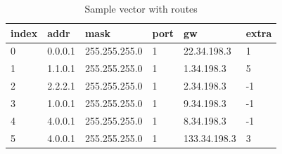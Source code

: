 \documentclass[a4paper,marginparwidth=50pt,marginparsep=10pt]{article}
\begin{document}
\begin{table}[float=tph]
\begin{center}
\begin{tabular}{|l|l|l|l|l|l|}
\hline index & addr & mask & port & gw & extra\\ 
\hline 0 & 0.0.0.1 & 255.255.255.0 & 1& 22.34.198.3 & 1\\ 
\hline 1 & 1.1.0.1 & 255.255.255.0 & 1& 1.34.198.3 & 5\\
\hline 2 & 2.2.2.1 & 255.255.255.0 & 1& 2.34.198.3 & -1\\
\hline 3 & 1.0.0.1 & 255.255.255.0 & 1& 9.34.198.3 & -1\\
\hline 4 & 4.0.0.1 & 255.255.255.0 & 1& 8.34.198.3 & -1\\
\hline 5 & 4.0.0.1 & 255.255.255.0 & 1& 133.34.198.3 & 3\\
\hline
\end{tabular}
\end{center}
\caption{Sample vector with routes}
\label{tbl:vector}
\end{table}
\end{document}

